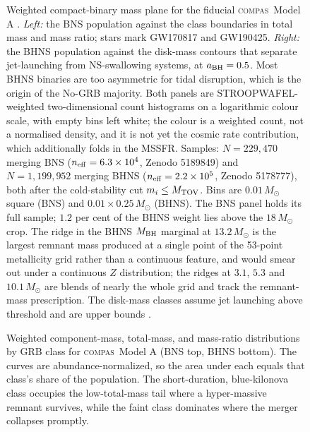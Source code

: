 \documentclass[twocolumn,apj]{openjournal}
\newcommand{\compas}{\textsc{compas}}
\begin{document}
\begin{figure}[!tbp]
\caption{Weighted compact-binary mass plane for the fiducial \compas\ Model A
\citep{broekgaarden2021}. \textit{Left:} the BNS population against the
\citet{gottlieb2024} class boundaries in total mass and mass ratio; stars mark
GW170817 and GW190425. \textit{Right:} the BHNS population against the
\citet{foucart2018} disk-mass contours that separate jet-launching from
NS-swallowing systems, at $a_{\rm BH} = 0.5$. Most BHNS binaries are too
asymmetric for tidal disruption, which is the origin of the No-GRB majority.
Both panels are STROOPWAFEL-weighted two-dimensional count histograms on a
logarithmic colour scale, with empty bins left white; the colour is a weighted
count, not a normalised density, and it is not yet the cosmic rate
contribution, which additionally folds in the MSSFR. Samples: $N = 229{,}470$
merging BNS ($n_{\rm eff} = 6.3 \times 10^{4}$, Zenodo 5189849) and
$N = 1{,}199{,}952$ merging BHNS ($n_{\rm eff} = 2.2 \times 10^{5}$, Zenodo
5178777), both after the cold-stability cut $m_i \leq M_{\rm TOV}$. Bins are
$0.01\,M_\odot$ square (BNS) and $0.01 \times 0.25\,M_\odot$ (BHNS). The BNS
panel holds its full sample; $1.2$ per cent of the BHNS weight lies above the
$18\,M_\odot$ crop. The ridge in the BHNS $M_{\rm BH}$ marginal at
$13.2\,M_\odot$ is the largest remnant mass produced at a single point of the
53-point metallicity grid rather than a continuous feature, and would smear out
under a continuous $Z$ distribution; the ridges at $3.1$, $5.3$ and
$10.1\,M_\odot$ are blends of nearly the whole grid and track the remnant-mass
prescription. The disk-mass classes assume
jet launching above threshold and are upper bounds \citep{gottlieb2023}.
\label{fig:massplane}}
\end{figure}

\begin{figure}[!tbp]
\caption{Weighted component-mass, total-mass, and mass-ratio distributions by
GRB class for \compas\ Model A (BNS top, BHNS bottom). The curves are
abundance-normalized, so the area under each equals that class's share of the
population. The short-duration, blue-kilonova class occupies the
low-total-mass tail where a hyper-massive remnant survives, while the faint
class dominates where the merger collapses promptly.
\label{fig:massdist}}
\end{figure}
\end{document}
